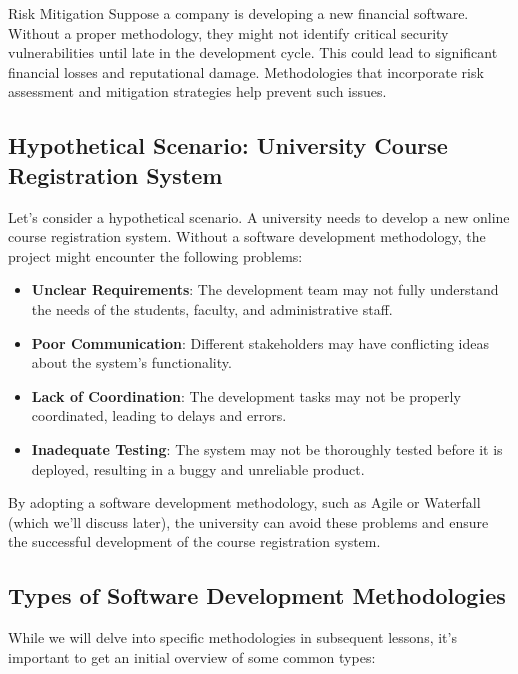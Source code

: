 \begin{examplebox}{Risk Mitigation}
  Suppose a company is developing a new financial software. Without a proper methodology, they might not identify critical security vulnerabilities until late in the development cycle. This could lead to significant financial losses and reputational damage. Methodologies that incorporate risk assessment and mitigation strategies help prevent such issues.
\end{examplebox}

\subsection{Hypothetical Scenario: University Course Registration System}

Let's consider a hypothetical scenario. A university needs to develop a new
online course registration system. Without a software development methodology,
the project might encounter the following problems:

\begin{itemize}
  \item \textbf{Unclear Requirements}: The development team may not fully understand the needs of the students, faculty, and administrative staff.
  \item \textbf{Poor Communication}: Different stakeholders may have conflicting ideas about the system's functionality.
  \item \textbf{Lack of Coordination}: The development tasks may not be properly coordinated, leading to delays and errors.
  \item \textbf{Inadequate Testing}: The system may not be thoroughly tested before it is deployed, resulting in a buggy and unreliable product.
\end{itemize}

By adopting a software development methodology, such as Agile or Waterfall
(which we'll discuss later), the university can avoid these problems and ensure
the successful development of the course registration system.

\subsection{Types of Software Development Methodologies}

While we will delve into specific methodologies in subsequent lessons, it's
important to get an initial overview of some common types:

